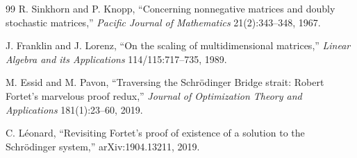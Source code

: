 \begin{thebibliography}{99}
R. Sinkhorn and P. Knopp,
``Concerning nonnegative matrices and doubly stochastic matrices,''
\emph{Pacific Journal of Mathematics} 21(2):343--348, 1967.

J. Franklin and J. Lorenz,
``On the scaling of multidimensional matrices,''
\emph{Linear Algebra and its Applications} 114/115:717--735, 1989.

M. Essid and M. Pavon,
``Traversing the Schr\"odinger Bridge strait: Robert Fortet's marvelous proof redux,''
\emph{Journal of Optimization Theory and Applications} 181(1):23--60, 2019.

C. L\'eonard,
``Revisiting Fortet's proof of existence of a solution to the Schr\"odinger system,''
arXiv:1904.13211, 2019.
\end{thebibliography}



